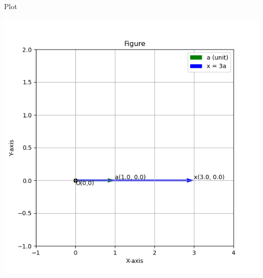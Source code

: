 \documentclass{beamer}
\begin{document}
\begin{frame}{Plot}
    \begin{center}
        \includegraphics[width=\columnwidth, height=0.8\textheight, keepaspectratio]{figs/figure1.png}
    \end{center}
\end{frame}
\end{document}
